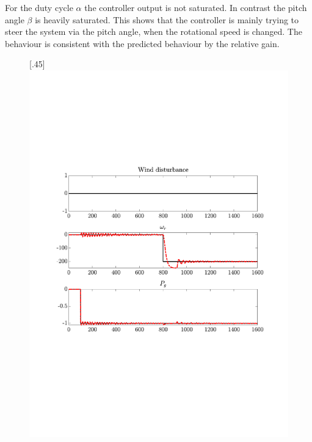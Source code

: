 For the duty cycle $\alpha$ the controller output is not saturated. 
In contrast the pitch angle $\beta$ is heavily saturated.
This shows that the controller is mainly trying to steer the system via the pitch angle, when the rotational speed is changed.
The behaviour is consistent with the predicted behaviour by the relative gain.  

\begin{figure}[H]
    \centering

    [.45\textwidth]{\includegraphics[width=1\linewidth, scale=1, trim=60 230 55 150,clip]{fig/Open_loop/exp_1_ref.pdf}}
%

\end{figure}
